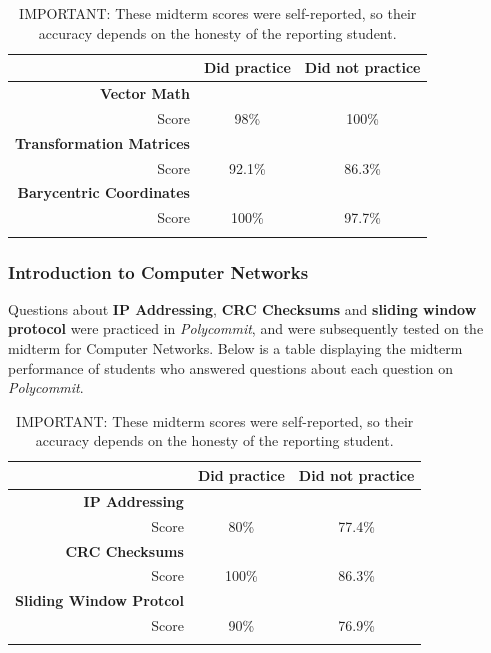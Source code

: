 \begin{table}
	\begin{tabular}[h!]{ r c c }
		& \textbf{Did practice} & \textbf{Did not practice} \\
		\hline
		\textbf{Vector Math} & & \\
		Score & 98\% & 100\%  \\
		
		\hline
		\textbf{Transformation Matrices} & &  \\
		Score  & 92.1\% & 86.3\% \\
		
		\hline
		\textbf{Barycentric Coordinates} & &  \\
		Score  & 100\% & 97.7\% \\
		
		\caption{IMPORTANT: These midterm scores were self-reported, so their accuracy depends on the honesty of the reporting student.}
	\end{tabular}
\end{table}

\subsubsection{Introduction to Computer Networks}

\par Questions about \textbf{IP Addressing}, \textbf{CRC Checksums} and \textbf{sliding window protocol} were practiced in \textit{Polycommit}, and were subsequently tested on the midterm for Computer Networks. Below is a table displaying the midterm performance of students who answered questions about each question on \textit{Polycommit}.

\begin{table}
	\begin{tabular}[h!]{ r c c }
		& \textbf{Did practice} & \textbf{Did not practice} \\
		\hline
		\textbf{IP Addressing} & & \\
		Score & 80\% & 77.4\%  \\
		
		\hline
		\textbf{CRC Checksums} & &  \\
		Score  & 100\% & 86.3\% \\
		
		\hline
		\textbf{Sliding Window Protcol} & &  \\
		Score  & 90\% & 76.9\% \\
		
		\caption{IMPORTANT: These midterm scores were self-reported, so their accuracy depends on the honesty of the reporting student.}
	\end{tabular}
\end{table}

